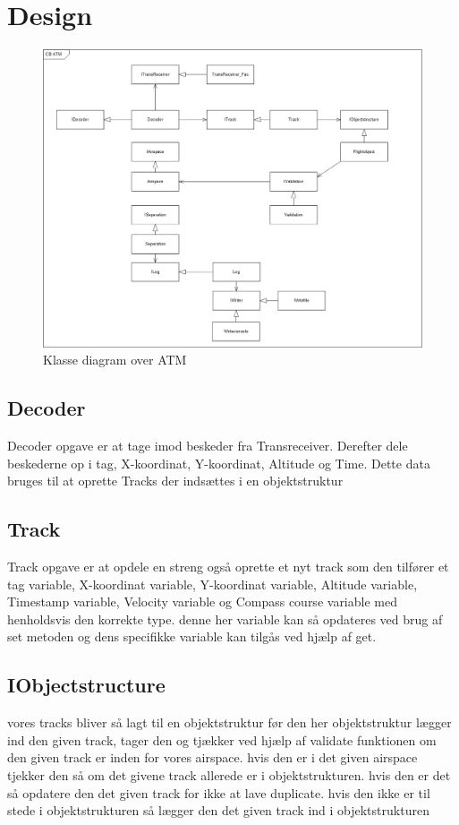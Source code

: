 \section{Design}
\begin{figure}[H]
	\centering
	\includegraphics[width=1\linewidth]{../Diagrammer/CD_ATM}
	\caption{Klasse diagram over ATM}
	\label{fig:cdatm}
\end{figure}

\subsection{Decoder}
Decoder opgave er at tage imod beskeder fra Transreceiver. Derefter dele beskederne op i tag, X-koordinat, Y-koordinat, Altitude og Time. Dette data bruges til at oprette Tracks der indsættes i en objektstruktur
\subsection{Track}
Track opgave er at opdele en streng også oprette et nyt track som den tilfører et tag variable, X-koordinat variable, Y-koordinat variable, Altitude variable, Timestamp variable, Velocity variable og Compass course variable med henholdsvis den korrekte type. denne her variable kan så opdateres ved brug af set metoden og dens specifikke variable kan tilgås ved hjælp af get.
\subsection{IObjectstructure}
vores tracks bliver så lagt til en objektstruktur før den her objektstruktur lægger ind den given track, tager den og tjækker ved hjælp af validate funktionen om den given track er inden for vores airspace. hvis den er i det given airspace tjekker den så om det givene track allerede er i objektstrukturen. hvis den er det så opdatere den det given track for ikke at lave duplicate. hvis den ikke er til stede i objektstrukturen så lægger den det given track ind i objektstrukturen
